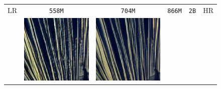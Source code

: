 \begin{figure}[!ht]
\begin{tabular}[t]{c c c c c c}
    \\[-0.2em]
    \scriptsize LR &  \scriptsize \texttt{558M} & \scriptsize \texttt{704M} & \scriptsize \texttt{866M} & \scriptsize \texttt{2B} & \scriptsize HR
    \\
    &
    \includegraphics[width=\xwidth]{cp2/figures/sr/scaling_sr_c96_1.png} &
    \includegraphics[width=\xwidth]{cp2/figures/sr/scaling_sr_c128_1.png} &

\end{tabular}
\end{figure}
